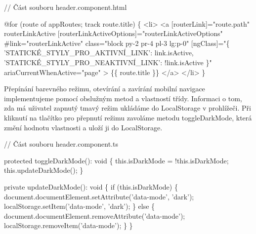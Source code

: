 \begin{prog}
// Část souboru header.component.html

@for (route of appRoutes; track route.title) \{
  <li>
    <a
      [routerLink]="route.path"
      routerLinkActive
      [routerLinkActiveOptions]="routerLinkActiveOptions"
      #link="routerLinkActive"
      class="block py-2 pr-4 pl-3 lg:p-0"
      [ngClass]="\{
        'STATICKÉ_STYLY_PRO_AKTIVNÍ_LINK': link.isActive,
        'STATICKÉ_STYLY_PRO_NEAKTIVNÍ_LINK': !link.isActive
      \}"
      ariaCurrentWhenActive="page"
    >
      \{\{ route.title \}\}
    </a>
  </li>
\}
\end{prog}

Přepínání barevného režimu, otevírání a zavírání mobilní navigace implementujeme pomocí obslužným metod a vlastností třídy. 
Informaci o tom, zda má uživatel zapnutý tmavý režim ukládáme do LocalStorage v prohlížeči. 
Při kliknutí na tlačítko pro přepnutí režimu zavoláme metodu toggleDarkMode, která změní hodnotu vlastnosti a uloží ji do LocalStorage.

\begin{prog}
// Část souboru header.component.ts

protected toggleDarkMode(): void \{
  this.isDarkMode = !this.isDarkMode;
  this.updateDarkMode();
\}

private updateDarkMode(): void \{
  if (this.isDarkMode) \{
    document.documentElement.setAttribute('data-mode', 'dark');
    localStorage.setItem('data-mode', 'dark');
  \} else \{
    document.documentElement.removeAttribute('data-mode');
    localStorage.removeItem('data-mode');
  \}
\}
\end{prog}